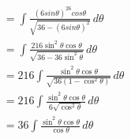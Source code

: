 \documentclass[preview]{standalone}
\begin{document}
\begin{align*}
&=\int \frac{(6sin\theta)^26cos\theta}{\sqrt{36-(6sin\theta)^2}} \, d\theta \\ &=\int \frac{216\sin^2\theta\cos\theta}{\sqrt{36-36\sin^2\theta}} \, d\theta \\&=216 \int \frac{\sin^2\theta\cos\theta}{\sqrt{36(1-\cos^2\theta)}} \, d\theta \\&=216 \int \frac{\sin^2\theta\cos\theta}{6\sqrt{\cos^2\theta}} \, d\theta \\&=36 \int \frac{\sin^2\theta\cos\theta}{\cos\theta} \, d\theta \\
\end{align*}
\end{document}
